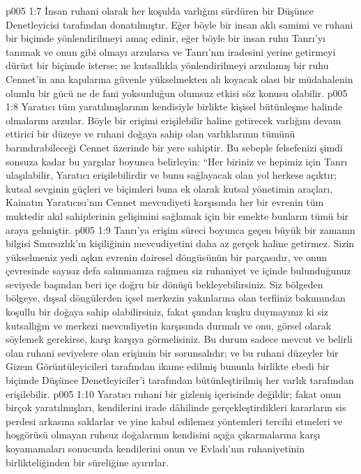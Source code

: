 \vs p005 1:7 İnsan ruhani olarak her koşulda varlığını sürdüren bir Düşünce Denetleyicisi tarafından donatılmıştır. Eğer böyle bir insan aklı samimi ve ruhani bir biçimde yönlendirilmeyi amaç edinir, eğer böyle bir insan ruhu Tanrı’yı tanımak ve onun gibi olmayı arzularsa ve Tanrı’nın iradesini yerine getirmeyi dürüst bir biçimde isterse; ne kutsallıkla yönlendirilmeyi arzulamış bir ruhu Cennet’in ana kapılarına güvenle yükselmekten alı koyacak olası bir müdahalenin olumlu bir gücü ne de fani yoksunluğun olumsuz etkisi söz konusu olabilir.
\vs p005 1:8 Yaratıcı tüm yaratılmışlarının kendisiyle birlikte kişisel bütünleşme halinde olmalarını arzular. Böyle bir erişimi erişilebilir haline getirecek varlığını devam ettirici bir düzeye ve ruhani doğaya sahip olan varlıklarının tümünü barındırabileceği Cennet üzerinde bir yere sahiptir. Bu sebeple felsefenizi şimdi sonsuza kadar bu yargılar boyunca belirleyin: “Her biriniz ve hepimiz için Tanrı ulaşılabilir, Yaratıcı erişilebilirdir ve bunu sağlayacak olan yol herkese açıktır; kutsal sevginin güçleri ve biçimleri buna ek olarak kutsal yönetimin araçları, Kainatın Yaratıcısı’nın Cennet mevcudiyeti karşısında her bir evrenin tüm muktedir akıl sahiplerinin gelişimini sağlamak için bir emekte bunların tümü bir araya gelmiştir.
\vs p005 1:9 Tanrı’ya erişim süreci boyunca geçen büyük bir zamanın bilgisi Sınırsızlık’ın kişiliğinin mevcudiyetini daha az gerçek haline getirmez. Sizin yükselmeniz yedi aşkın evrenin dairesel döngüsünün bir parçasıdır, ve onun çevresinde sayısız defa salınmanıza rağmen siz ruhaniyet ve içinde bulunduğunuz seviyede başından beri içe doğru bir dönüşü bekleyebilirsiniz. Siz bölgeden bölgeye, dışsal döngülerden içsel merkezin yakınlarına olan terfiiniz bakımından koşullu bir doğaya sahip olabilirsiniz, fakat şundan kuşku duymayınız ki siz kutsallığın ve merkezi mevcudiyetin karşısında durmalı ve onu, görsel olarak söylemek gerekirse, karşı karşıya görmelisiniz. Bu durum sadece mevcut ve belirli olan ruhani seviyelere olan erişimin bir sorunsalıdır; ve bu ruhani düzeyler bir Gizem Görüntüleyicileri tarafından ikame edilmiş bununla birlikte ebedi bir biçimde Düşünce Denetleyiciler’i tarafından bütünleştirilmiş her varlık tarafından erişilebilir.
\vs p005 1:10 Yaratıcı ruhani bir gizleniş içerisinde değildir; fakat onun birçok yaratılmışları, kendilerini irade dâhilinde gerçekleştirdikleri kararların sis perdesi arkasına saklarlar ve yine kabul edilemez yöntemleri tercihi etmeleri ve hoşgörüsü olmayan ruhsuz doğalarının kendisini açığa çıkarmalarına karşı koyamamaları sonucunda kendilerini onun ve Evladı’nın ruhaniyetinin birlikteliğinden bir süreliğine ayırırlar.
